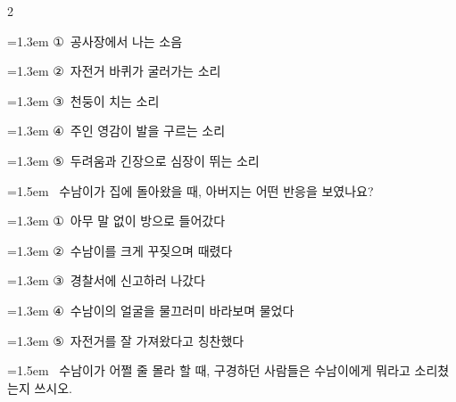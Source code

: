 \documentclass[11pt, a4paper]{article}
\begin{document}
\begin{multicols}{2}
\begin{minipage}{\columnwidth}
\vspace{0.5mm}
{\hangindent=1.3em  \noindent\hspace{0.3em}①~공사장에서 나는 소음\par}
{\hangindent=1.3em  \noindent\hspace{0.3em}②~자전거 바퀴가 굴러가는 소리\par}
{\hangindent=1.3em  \noindent\hspace{0.3em}③~천둥이 치는 소리\par}
{\hangindent=1.3em  \noindent\hspace{0.3em}④~주인 영감이 발을 구르는 소리\par}
{\hangindent=1.3em  \noindent\hspace{0.3em}⑤~두려움과 긴장으로 심장이 뛰는 소리\par}
\vspace{4mm}
\end{minipage}
\par

\noindent\begin{minipage}{\columnwidth}
\vspace{2mm}
{\hangindent=1.5em  ~수남이가 집에 돌아왔을 때, 아버지는 어떤 반응을 보였나요?\par}

\vspace{0.5mm}
{\hangindent=1.3em  \noindent\hspace{0.3em}①~아무 말 없이 방으로 들어갔다\par}
{\hangindent=1.3em  \noindent\hspace{0.3em}②~수남이를 크게 꾸짖으며 때렸다\par}
{\hangindent=1.3em  \noindent\hspace{0.3em}③~경찰서에 신고하러 나갔다\par}
{\hangindent=1.3em  \noindent\hspace{0.3em}④~수남이의 얼굴을 물끄러미 바라보며 물었다\par}
{\hangindent=1.3em  \noindent\hspace{0.3em}⑤~자전거를 잘 가져왔다고 칭찬했다\par}
\vspace{4mm}
\end{minipage}
\par

\noindent\begin{minipage}{\columnwidth}
\vspace{2mm}
{\hangindent=1.5em  ~수남이가 어쩔 줄 몰라 할 때, 구경하던 사람들은 수남이에게 뭐라고 소리쳤는지 쓰시오.\par}


\end{minipage}
\end{multicols}
\end{document}
